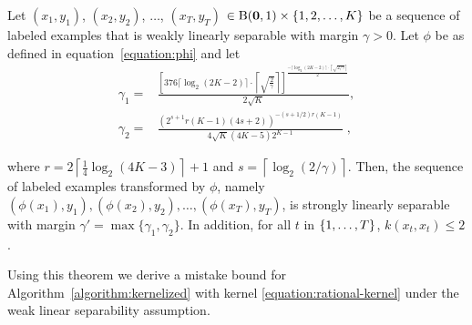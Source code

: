 \begin{theorem}
\label{theorem:margin-transformation}
Let $(x_1, y_1)$, $(x_2, y_2)$, $\dots$, $(x_T, y_T)$ $\in \operatorname{B}(\mathbf{0},1) \times
\{1,2,\dots,K\}$ be a sequence of labeled examples that is weakly linearly
separable with margin $\gamma > 0$. Let $\phi$ be as defined in
equation~\eqref{equation:phi} and let
\begingroup
\allowdisplaybreaks
\begin{align*}
\gamma_1 = & \frac{
  \left[
    376 \lceil \log_2(2K-2) \rceil \cdot \left \lceil \sqrt{\frac{2}{\gamma}} \right \rceil
  \right]^{
    \frac{-\lceil \log_2(2K-2) \rceil \cdot \left \lceil \sqrt{{2}/{\gamma}} \right \rceil}{2}
  }
}{2\sqrt{K}},\\
\gamma_2 = & \frac{
   \left(2^{s+1} r(K-1) (4s+2) \right)^{-(s+1/2)r(K-1)}
}{4\sqrt{K}(4K-5) 2^{K-1}}
\; ,
\end{align*}
\endgroup


where $r = 2 \left\lceil \frac{1}{4} \log_2(4K-3) \right\rceil + 1$ and $s = \left \lceil \log_2(2/\gamma) \right \rceil$.
Then, the sequence of labeled examples transformed by $\phi$,
namely $(\phi(x_1), y_1), (\phi(x_2), y_2), \dots,
(\phi(x_T), y_T)$, is strongly linearly separable with margin $\gamma' =
\max\{\gamma_1, \gamma_2\}$. In addition, for all $t$ in $\cbr{1,\ldots,T}$,
$k(x_t,x_t) \leq 2$.
\end{theorem}

Using this theorem we derive a mistake bound for
Algorithm~\ref{algorithm:kernelized} with kernel \eqref{equation:rational-kernel}
under the weak linear separability assumption.

